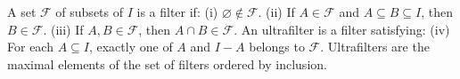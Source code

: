 A set $\mathcal{F}$ of subsets of $I$ is a filter if:
(i) $\varnothing \notin \mathcal{F}$.
(ii) If $A \in \mathcal{F}$ and $A \subseteq B \subseteq I$, then $B \in \mathcal{F}$.
(iii) If $A, B \in \mathcal{F}$, then $A \cap B \in \mathcal{F}$.
An ultrafilter is a filter satisfying:
(iv) For each $A \subseteq I$, exactly one of $A$ and $I - A$ belongs to $\mathcal{F}$.
Ultrafilters are the maximal elements of the set of filters ordered by inclusion.
